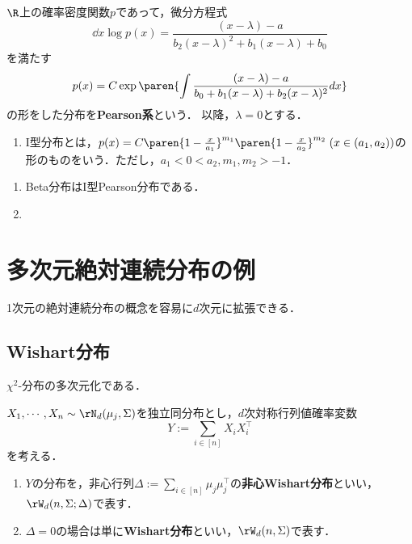 \documentclass[uplatex,dvipdfmx]{jsreport}
\begin{document}
\begin{definition}
    $\R$上の確率密度関数$p$であって，微分方程式
    \[\dd{}{x}\log p(x)=\frac{(x-\lambda)-a}{b_2(x-\lambda)^2+b_1(x-\lambda)+b_0}\]
    を満たす
    \[p(x)=C\exp\paren{\int\frac{(x-\lambda)-a}{b_0+b_1(x-\lambda)+b_2(x-\lambda)^2}dx}\]
    の形をした分布を\textbf{Pearson系}という．
    以降，$\lambda=0$とする．
    \begin{enumerate}
        \item I型分布とは，$p(x)=C\paren{1-\frac{x}{a_1}}^{m_1}\paren{1-\frac{x}{a_2}}^{m_2}\;(x\in(a_1,a_2))$の形のものをいう．ただし，$a_1<0<a_2,m_1,m_2>-1$．
    \end{enumerate}
\end{definition}
\begin{example}\mbox{}
    \begin{enumerate}
        \item Beta分布はI型Pearson分布である．
        \item 
    \end{enumerate}
\end{example}

\section{多次元絶対連続分布の例}

\begin{tcolorbox}[colframe=ForestGreen, colback=ForestGreen!10!white,breakable,colbacktitle=ForestGreen!40!white,coltitle=black,fonttitle=\bfseries\sffamily,
title=]
    1次元の絶対連続分布の概念を容易に$d$次元に拡張できる．
\end{tcolorbox}

\subsection{Wishart分布}

\begin{tcolorbox}[colframe=ForestGreen, colback=ForestGreen!10!white,breakable,colbacktitle=ForestGreen!40!white,coltitle=black,fonttitle=\bfseries\sffamily,
title=]
    $\chi^2$-分布の多次元化である．
\end{tcolorbox}

\begin{definition}
    $X_1,\cdots,X_n\sim\rN_d(\mu_j,\Sigma)$を独立同分布とし，$d$次対称行列値確率変数
    \[Y:=\sum_{i\in[n]}X_iX_i^\top\]
    を考える．
    \begin{enumerate}
        \item $Y$の分布を，非心行列$\Delta:=\sum_{i\in[n]}\mu_j\mu_j^\top$の\textbf{非心Wishart分布}といい，$\rW_d(n,\Sigma;\Delta)$で表す．
        \item $\Delta=0$の場合は単に\textbf{Wishart分布}といい，$\rW_d(n,\Sigma)$で表す．
    \end{enumerate}
\end{definition}
\end{document}
